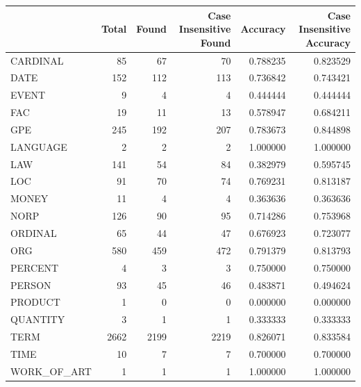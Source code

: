 \begin{tabular}{lrrrrr}
\toprule
 & Total & Found & Case Insensitive Found & Accuracy & Case Insensitive Accuracy \\
\midrule
CARDINAL & 85 & 67 & 70 & 0.788235 & 0.823529 \\
DATE & 152 & 112 & 113 & 0.736842 & 0.743421 \\
EVENT & 9 & 4 & 4 & 0.444444 & 0.444444 \\
FAC & 19 & 11 & 13 & 0.578947 & 0.684211 \\
GPE & 245 & 192 & 207 & 0.783673 & 0.844898 \\
LANGUAGE & 2 & 2 & 2 & 1.000000 & 1.000000 \\
LAW & 141 & 54 & 84 & 0.382979 & 0.595745 \\
LOC & 91 & 70 & 74 & 0.769231 & 0.813187 \\
MONEY & 11 & 4 & 4 & 0.363636 & 0.363636 \\
NORP & 126 & 90 & 95 & 0.714286 & 0.753968 \\
ORDINAL & 65 & 44 & 47 & 0.676923 & 0.723077 \\
ORG & 580 & 459 & 472 & 0.791379 & 0.813793 \\
PERCENT & 4 & 3 & 3 & 0.750000 & 0.750000 \\
PERSON & 93 & 45 & 46 & 0.483871 & 0.494624 \\
PRODUCT & 1 & 0 & 0 & 0.000000 & 0.000000 \\
QUANTITY & 3 & 1 & 1 & 0.333333 & 0.333333 \\
TERM & 2662 & 2199 & 2219 & 0.826071 & 0.833584 \\
TIME & 10 & 7 & 7 & 0.700000 & 0.700000 \\
WORK_OF_ART & 1 & 1 & 1 & 1.000000 & 1.000000 \\
\bottomrule
\end{tabular}
